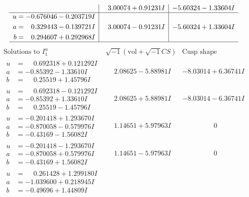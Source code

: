 \documentclass[1p]{elsarticle_modified}
\theoremstyle{definition}
\newcommand{\I}{\sqrt{-1}}
\begin{document}
$$\begin{array}{c|c|c}
 & \phantom{-}3.00074 + 0.91231 I & -5.60324 - 1.33604 I \\ \hline\begin{aligned}
u &= -0.676046 - 0.203719 I \\
a &= \phantom{-}0.329443 - 0.139721 I \\
b &= \phantom{-}0.294607 + 0.292968 I\end{aligned}
 & \phantom{-}3.00074 - 0.91231 I & -5.60324 + 1.33604 I\\
 \hline 
 \end{array}$$\newpage$$\begin{array}{c|c|c}  
\text{Solutions to }I^u_{1}& \I (\text{vol} + \sqrt{-1}CS) & \text{Cusp shape}\\
 \hline 
\begin{aligned}
u &= \phantom{-}0.692318 + 0.121292 I \\
a &= -0.85392 - 1.33610 I \\
b &= \phantom{-}0.25519 + 1.45796 I\end{aligned}
 & \phantom{-}2.08625 - 5.88981 I & -8.03014 + 6.36741 I \\ \hline\begin{aligned}
u &= \phantom{-}0.692318 - 0.121292 I \\
a &= -0.85392 + 1.33610 I \\
b &= \phantom{-}0.25519 - 1.45796 I\end{aligned}
 & \phantom{-}2.08625 + 5.88981 I & -8.03014 - 6.36741 I \\ \hline\begin{aligned}
u &= -0.201418 + 1.293670 I \\
a &= -0.870058 - 0.579976 I \\
b &= -0.43169 - 1.56082 I\end{aligned}
 & \phantom{-}1.14651 + 5.97963 I & \phantom{-0.000000 } 0 \\ \hline\begin{aligned}
u &= -0.201418 - 1.293670 I \\
a &= -0.870058 + 0.579976 I \\
b &= -0.43169 + 1.56082 I\end{aligned}
 & \phantom{-}1.14651 - 5.97963 I & \phantom{-0.000000 } 0 \\ \hline\begin{aligned}
u &= \phantom{-}0.261428 + 1.299180 I \\
a &= -1.039600 + 0.218945 I \\
b &= -0.49696 + 1.44809 I\end{aligned}

\end{array}$$
\end{document}
